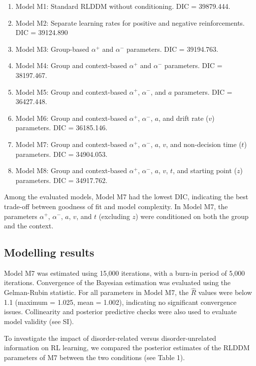 \documentclass[
  man,floatsintext]{apa6}
\providecommand{\tightlist}{%
  \setlength{\itemsep}{0pt}\setlength{\parskip}{0pt}}
\begin{document}
\begin{enumerate}
\def\labelenumi{\arabic{enumi}.}
\tightlist
\item
  Model M1: Standard RLDDM without conditioning. DIC = 39879.444.
\item
  Model M2: Separate learning rates for positive and negative reinforcements. DIC = 39124.890
\item
  Model M3: Group-based \(\alpha^+\) and \(\alpha^-\) parameters. DIC = 39194.763.
\item
  Model M4: Group and context-based \(\alpha^+\) and \(\alpha^-\) parameters. DIC = 38197.467.
\item
  Model M5: Group and context-based \(\alpha^+\), \(\alpha^-\), and \(a\) parameters. DIC = 36427.448.
\item
  Model M6: Group and context-based \(\alpha^+\), \(\alpha^-\), \(a\), and drift rate (\(v\)) parameters. DIC = 36185.146.
\item
  Model M7: Group and context-based \(\alpha^+\), \(\alpha^-\), \(a\), \(v\), and non-decision time (\(t\)) parameters. DIC = 34904.053.
\item
  Model M8: Group and context-based \(\alpha^+\), \(\alpha^-\), \(a\), \(v\), \(t\), and starting point (\(z\)) parameters. DIC = 34917.762.
\end{enumerate}

Among the evaluated models, Model M7 had the lowest DIC, indicating the best trade-off between goodness of fit and model complexity. In Model M7, the parameters \(\alpha^+\), \(\alpha^-\), \(a\), \(v\), and \(t\) (excluding \(z\)) were conditioned on both the group and the context.

\hypertarget{modelling-results}{%
\subsection{Modelling results}\label{modelling-results}}

Model M7 was estimated using 15,000 iterations, with a burn-in period of 5,000 iterations. Convergence of the Bayesian estimation was evaluated using the Gelman-Rubin statistic. For all parameters in Model M7, the \(\hat{R}\) values were below 1.1 (maximum = 1.025, mean = 1.002), indicating no significant convergence issues. Collinearity and posterior predictive checks were also used to evaluate model validity (see SI).

To investigate the impact of disorder-related versus disorder-unrelated information on RL learning, we compared the posterior estimates of the RLDDM parameters of M7 between the two conditions (see Table 1).
\end{document}
